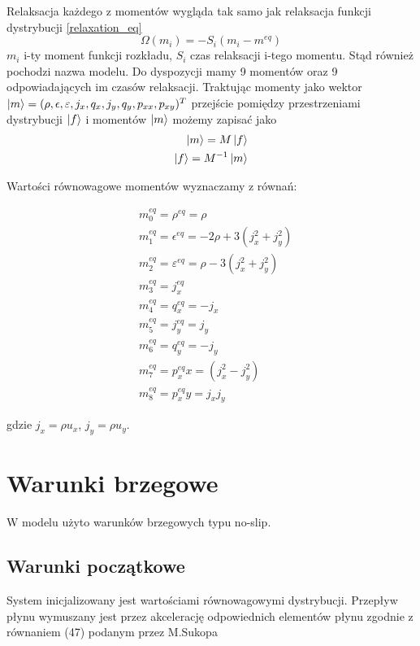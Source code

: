 \documentclass[a4paper,11pt,twoside]{article}
\begin{document}
Relaksacja każdego z momentów wygląda tak samo jak relaksacja funkcji dystrybucji \ref{relaxation_eq}
\begin{equation}
\Omega(m_i) = - S_i(m_i - m^{eq})
\label{moment_relaxation_eq}
\end{equation}
$m_i$ i-ty moment funkcji rozkładu, $S_i$ czas relaksacji i-tego momentu. Stąd również pochodzi nazwa modelu. Do dyspozycji mamy 9 momentów oraz 9 odpowiadających im czasów relaksacji. Traktując momenty jako wektor $\ket{m} = (\rho, \epsilon, \varepsilon, j_x, q_x, j_y, q_y, p_{xx}, p_{xy})^T$ przejście pomiędzy przestrzeniami dystrybucji $\ket{f}$ i momentów  $\ket{m}$ możemy zapisać jako
\begin{eqnarray}
\ket{m} = M\ket{f} \\
\label{tr_f_m}
\ket{f} = M^{-1}\ket{m}
\label{tr_m_f}
\end{eqnarray}

Wartości równowagowe momentów wyznaczamy z równań:

\begin{eqnarray}
&m^{eq}_0 = \rho^{eq} = \rho \\
&m^{eq}_1 = \epsilon^{eq} = -2\rho + 3(j^2_x + j^2_y) \\
&m^{eq}_2 = \varepsilon^{eq} = \rho - 3(j^2_x + j^2_y)  \\
&m^{eq}_3 = j^{eq}_x\\ 
&m^{eq}_4 = q^{eq}_x = -j_x    \\ 
&m^{eq}_5 = j^{eq}_y = j_y  \\
&m^{eq}_6 = q^{eq}_y = -j_y      \\
&m^{eq}_7 = p^{eq}_xx = (j^2_x - j^2_y)  \\
&m^{eq}_8 = p^{eq}_xy = j_xj_y
\label{moment_equilibria}
\end{eqnarray}

gdzie $j_x = \rho u_x$, $j_y = \rho u_y$.

\section{Warunki brzegowe}
W modelu użyto warunków brzegowych typu no-slip.

\subsection{Warunki początkowe}
System inicjalizowany jest wartościami równowagowymi dystrybucji. Przepływ płynu wymuszany jest przez akcelerację odpowiednich elementów płynu zgodnie z równaniem (47) podanym przez M.Sukopa \cite{sukop}
\end{document}
